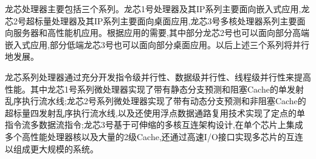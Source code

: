 

龙芯处理器主要包括三个系列。龙芯1号处理器及其IP系列主要面向嵌入式应用,龙芯2号超标量处理器及其IP系列主要面向桌面应用,龙芯3号多核处理器系列主要面向服务器和高性能机应用。根据应用的需要,其中部分龙芯2号也可以面向部分高端嵌入式应用,部分低端龙芯3号也可以面向部分桌面应用。以后上述三个系列将并行地发展。

龙芯系列处理器通过充分开发指令级并行性、数据级并行性、线程级并行性来提高性能。其中龙芯1号系列微处理器实现了带有静态分支预测和阻塞Cache的单发射乱序执行流水线;龙芯2号系列微处理器实现了带有动态分支预测和非阻塞Cache的超标量四发射乱序执行流水线,以及还使用浮点数据通路复用技术实现了定点的单指令流多数据流指令;龙芯3号基于可伸缩的多核互连架构设计,在单个芯片上集成多个高性能处理器核以及大量的2级Cache,还通过高速I/O接口实现多芯片的互连以组成更大规模的系统。
